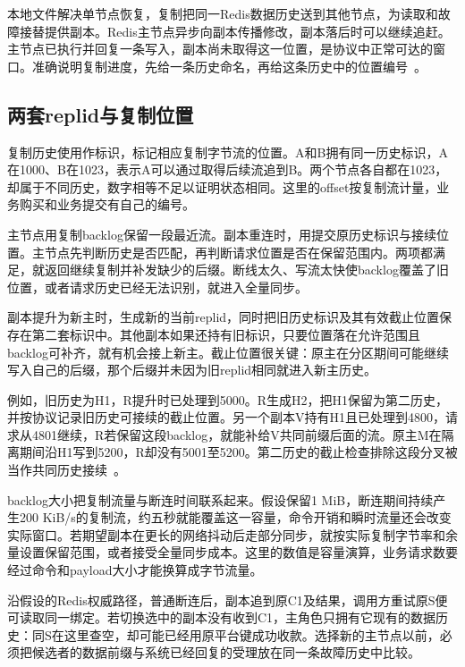 本地文件解决单节点恢复，复制把同一Redis数据历史送到其他节点，为读取和故障接替提供副本。Redis主节点异步向副本传播修改，副本落后时可以继续追赶。主节点已执行并回复一条写入，副本尚未取得这一位置，是协议中正常可达的窗口。准确说明复制进度，先给一条历史命名，再给这条历史中的位置编号~\cite{redis8102-replication}。

\subsection{两套replid与复制位置}

复制历史使用作标识，标记相应复制字节流的位置。A和B拥有同一历史标识，A在1000、B在1023，表示A可以通过取得后续流追到B。两个节点各自都在1023，却属于不同历史，数字相等不足以证明状态相同。这里的offset按复制流计量，业务购买和业务提交有自己的编号。

主节点用复制backlog保留一段最近流。副本重连时，用提交原历史标识与接续位置。主节点先判断历史是否匹配，再判断请求位置是否在保留范围内。两项都满足，就返回继续复制并补发缺少的后缀。断线太久、写流太快使backlog覆盖了旧位置，或者请求历史已经无法识别，就进入全量同步。


副本提升为新主时，生成新的当前replid，同时把旧历史标识及其有效截止位置保存在第二套标识中。其他副本如果还持有旧标识，只要位置落在允许范围且backlog可补齐，就有机会接上新主。截止位置很关键：原主在分区期间可能继续写入自己的后缀，那个后缀并未因为旧replid相同就进入新主历史。

例如，旧历史为H1，R提升时已处理到5000。R生成H2，把H1保留为第二历史，并按协议记录旧历史可接续的截止位置。另一个副本V持有H1且已处理到4800，请求从4801继续，R若保留这段backlog，就能补给V共同前缀后面的流。原主M在隔离期间沿H1写到5200，R却没有5001至5200。第二历史的截止检查排除这段分叉被当作共同历史接续~\cite{redis8102-source}。

backlog大小把复制流量与断连时间联系起来。假设保留1 MiB，断连期间持续产生200 KiB/s的复制流，约五秒就能覆盖这一容量，命令开销和瞬时流量还会改变实际窗口。若期望副本在更长的网络抖动后走部分同步，就按实际复制字节率和余量设置保留范围，或者接受全量同步成本。这里的数值是容量演算，业务请求数要经过命令和payload大小才能换算成字节流量。

沿假设的Redis权威路径，普通断连后，副本追到原C1及结果，调用方重试原S便可读取同一绑定。若切换选中的副本没有收到C1，主角色只拥有它现有的数据历史：同S在这里查空，却可能已经用原平台键成功收款。选择新的主节点以前，必须把候选者的数据前缀与系统已经回复的受理放在同一条故障历史中比较。

